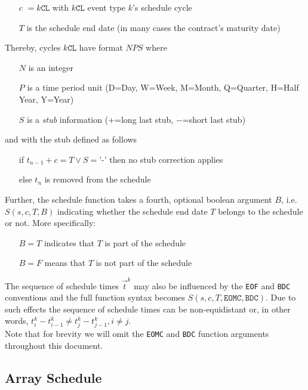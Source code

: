 \documentclass[9pt,oneside]{amsart}
\newcommand{\attr}[1]{\texttt{#1}}
\newcommand{\sdl}[3]{S(#1,#2,#3)}
\newcommand{\sdll}[4]{S(#1,#2,#3,#4)}
\begin{document}
\begin{multicols}{2}
\begin{itemize}
	\item[$c$] $=k\attr{CL}$ with $k\attr{CL}$ event type $k$'s schedule cycle

	\item[$T$] is the schedule end date (in many cases the contract's maturity date)
\end{itemize}

Thereby, cycles $k\attr{CL}$ have format $NPS$ where

\begin{itemize}
	\item[$N$] is an integer
	\item[$P$] is a time period unit (D=Day, W=Week, M=Month, Q=Quarter, H=Half Year, Y=Year)
	\item[$S$] is a \textit{stub} information ($+$=long last stub, $-$=short last stub)
\end{itemize}

and with the stub defined as follows

\begin{itemize}
	\item[if] $t_{n-1}+c=T \lor S=$'-' then no stub correction applies

	\item[else] $t_n$ is removed from the schedule
\end{itemize}

Further, the schedule function takes a fourth, optional boolean argument $B$, i.e. $\sdll{s}{c}{T}{B}$ indicating whether the schedule end date $T$ belongs to the schedule or not. More specifically:

\begin{itemize}
	\item[$B=T$] indicates that $T$ is part of the schedule
	\item[$B=F$] means that $T$ is not part of the schedule
\end{itemize}

The sequence of schedule times $\vec{t}^k$ may also be influenced by the \attr{EOF} and \attr{BDC} conventions and the full function syntax becomes $\sdl{s}{c}{T, \attr{EOMC}, \attr{BDC}}$. Due to such effects the sequence of schedule times can be non-equidistant or, in other words, $t_i^k-t_{i-1}^k\neq t_j^k-t_{j-1}^k, i\neq j$.\\

Note that for brevity we will omit the \attr{EOMC} and \attr{BDC} function arguments throughout this document.


\subsection{Array Schedule}\label{sec:arrayschedule}


\end{multicols}
\end{document}
